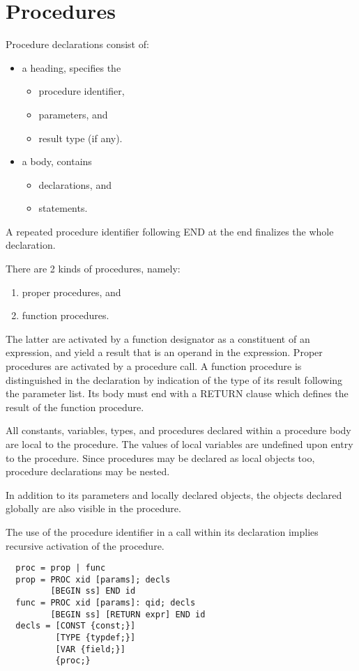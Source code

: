 \section{Procedures}
\label{sec:pro}
Procedure declarations consist of:
\begin{itemize}
  \item a heading, specifies the
  \begin{itemize}
    \item procedure identifier,
    \item parameters, and
    \item result type (if any).
  \end{itemize}
  \item a body, contains
  \begin{itemize}
    \item declarations, and
    \item statements.
  \end{itemize}
\end{itemize}
A repeated procedure identifier following END at the end finalizes the whole declaration.

There are 2 kinds of procedures, namely:
\begin{enumerate}
  \item proper procedures, and
  \item function procedures.
\end{enumerate}
The latter are activated by a function designator as a constituent of an expression, and yield a result
that is an operand in the expression. Proper procedures are activated by a procedure call. A function
procedure is distinguished in the declaration by indication of the type of its result following the
parameter list. Its body must end with a RETURN clause which defines the result of the function procedure.

All constants, variables, types, and procedures declared within a procedure body are local to the
procedure. The values of local variables are undefined upon entry to the procedure. Since procedures
may be declared as local objects too, procedure declarations may be nested.

In addition to its parameters and locally declared objects, the objects declared globally are
also visible in the procedure.

The use of the procedure identifier in a call within its declaration implies recursive activation of the
procedure.
\begin{verbatim}
  proc = prop | func
  prop = PROC xid [params]; decls
         [BEGIN ss] END id
  func = PROC xid [params]: qid; decls
         [BEGIN ss] [RETURN expr] END id
  decls = [CONST {const;}]
          [TYPE {typdef;}]
          [VAR {field;}]
          {proc;}
\end{verbatim}

